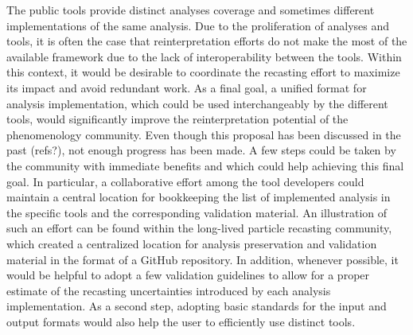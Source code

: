 \documentclass[11pt]{article}
\begin{document}
The public tools provide distinct analyses coverage and sometimes different implementations of the same analysis.
Due to the proliferation of analyses and tools, it is often the case that reinterpretation efforts do not make the most of the available framework due to the lack of interoperability between the tools.
Within this context, it would be desirable to coordinate the recasting effort to maximize its impact and avoid redundant work. 
As a final goal, a unified format for analysis implementation, which could be used interchangeably by the different tools, would significantly improve the reinterpretation potential of the phenomenology community.
Even though this proposal has been discussed in the past (refs?), not enough progress has been made.
A few steps could be taken by the community with immediate benefits and which could help achieving this final goal.
In particular, a collaborative effort among the tool developers could maintain a central location for bookkeeping the list of implemented analysis in the specific tools and the corresponding validation material.
An illustration of such an effort can be found within the 
long-lived particle recasting community, which created a centralized location for analysis preservation and validation material in the format of a GitHub repository\cite{llpRepo}.
In addition, whenever possible, it would be helpful to adopt a few validation guidelines to allow for a proper estimate of the recasting uncertainties introduced by each analysis implementation.
As a second step, adopting basic standards for the input and output formats would also help the user to efficiently use distinct tools.
\end{document}
